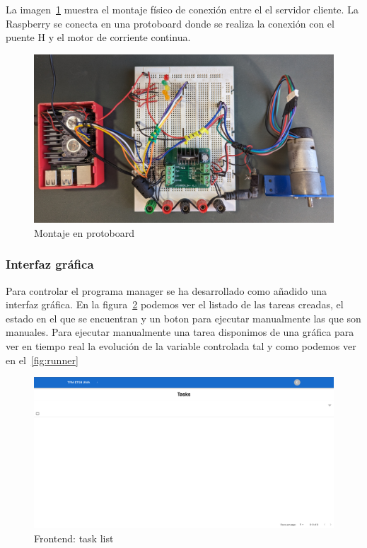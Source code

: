 La imagen~\cref{fig:montaje en protoboard} muestra el montaje físico de conexión entre el el servidor cliente. La Raspberry se conecta en una protoboard donde se realiza la conexión con el puente H y el motor de corriente continua.

\begin{figure}[H]
    \centering
    \includegraphics[height=0.2\textheight]{./part/Ejecucion/Seguimiento/PuestaAPunto/img/montajeProtoboard}
    \caption{Montaje en protoboard}\label{fig:montaje en protoboard}
\end{figure}

\subsubsection{Interfaz gráfica}

Para controlar el programa manager se ha desarrollado como añadido una interfaz gráfica. En la figura~\cref{fig:frontend} podemos ver el listado de las tareas creadas, el estado en el que se encuentran y un boton para ejecutar manualmente las que son manuales. Para ejecutar manualmente una tarea disponimos de una gráfica para ver en tiempo real la evolución de la variable controlada tal y como podemos ver en el~\cref{fig:runner}

\begin{figure}[H]
    \centering
    \includegraphics[height=0.2\textheight]{./part/Ejecucion/Seguimiento/PuestaAPunto/img/frontend}
    \caption{Frontend: task list}\label{fig:frontend}
\end{figure}

